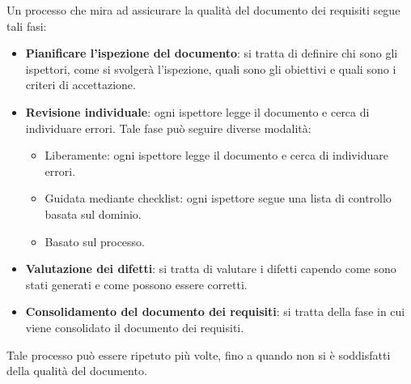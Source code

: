 Un processo che mira ad assicurare la qualità del documento dei requisiti segue tali fasi:
\begin{figure}[H]
    \centering
\end{figure}
\begin{itemize}
    \item \textbf{Pianificare l'ispezione del documento}: si tratta di definire
    chi sono gli ispettori, come si svolgerà l'ispezione, quali sono gli obiettivi
    e quali sono i criteri di accettazione.
    \item \textbf{Revisione individuale}: ogni ispettore legge il documento e
    cerca di individuare errori.
    Tale fase può seguire diverse modalità:
    \begin{itemize}
        \item Liberamente: ogni ispettore legge il documento e cerca di individuare
        errori.
        \item Guidata mediante checklist: ogni ispettore segue una lista di controllo
        basata sul dominio.
        \item Basato sul processo.
    \end{itemize}
    \item \textbf{Valutazione dei difetti}: si tratta di valutare i difetti
    capendo come sono stati generati e come possono essere corretti.
    \item \textbf{Consolidamento del documento dei requisiti}: si tratta della 
    fase in cui viene consolidato il documento dei requisiti.
\end{itemize}
Tale processo può essere ripetuto più volte, fino a quando non si è soddisfatti
della qualità del documento.
